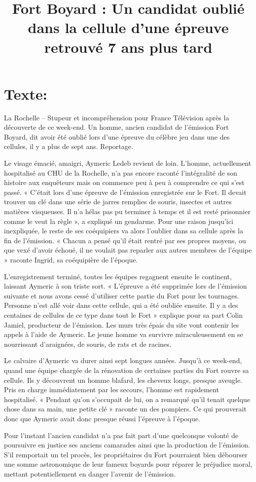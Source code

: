 \documentclass[11pt,a4paper]{article}
\title{Fort Boyard : Un candidat oublié dans la cellule d’une épreuve retrouvé 7 ans plus tard }
\begin{document}
\maketitle
\section*{Texte: }
La Rochelle – Stupeur et incompréhension pour France Télévision après la découverte de ce week-end. Un homme, ancien candidat de l’émission Fort Boyard, dit avoir été oublié lors d’une épreuve du célèbre jeu dans une des cellules, il y a plus de sept ans. Reportage.

Le visage émacié, amaigri, Aymeric Ledeb revient de loin. L’homme, actuellement hospitalisé au CHU de la Rochelle, n’a pas encore raconté l’intégralité de son histoire aux enquêteurs mais on commence peu à peu à comprendre ce qui s’est passé. « C’était lors d’une épreuve de l’émission enregistrée sur le Fort. Il devait trouver un clé dans une série de jarres remplies de souris, insectes et autres matières visqueuses. Il n’a hélas pas pu terminer à temps et il est resté prisonnier comme le veut la règle », a expliqué un gendarme. Pour une raison jusqu’ici inexpliquée, le reste de ses coéquipiers va alors l’oublier dans sa cellule après la fin de l’émission. « Chacun a pensé qu’il était rentré par ses propres moyens, ou que vexé d’avoir échoué, il ne voulait pas reparler aux autres membres de l’équipe » raconte Ingrid, sa coéquipière de l’époque.

L’enregistrement terminé, toutes les équipes regagnent ensuite le continent, laissant Aymeric à son triste sort. « L’épreuve a été supprimée lors de l’émission suivante et nous avons cessé d’utiliser cette partie du Fort pour les tournages. Personne n’est allé voir dans cette cellule, qui a été oubliée ensuite. Il y a des centaines de cellules de ce type dans tout le Fort » explique pour sa part Colin Jamiel, producteur de l’émission. Les murs très épais du site vont contenir les appels à l’aide de Aymeric. Le jeune homme va survivre miraculeusement en se nourrissant d’araignées, de souris, de rats  et de racines.

Le calvaire d’Aymeric va durer ainsi sept longues années. Jusqu’à ce week-end, quand une équipe chargée de la rénovation de certaines parties du Fort rouvre sa cellule. Ils y découvrent un homme blafard, les cheveux longs, presque aveugle. Pris en charge immédiatement par les secours, l’homme est rapidement hospitalisé. « Pendant qu’on s’occupait de lui, on a remarqué qu’il tenait quelque chose dans sa main, une petite clé » raconte un des pompiers. Ce qui prouverait donc que Aymeric avait donc presque réussi l’épreuve à l’époque.

Pour l’instant l’ancien candidat n’a pas fait part d’une quelconque volonté de poursuivre en justice ses anciens camarades ainsi que la production de l’émission. S’il remportait un tel procès, les propriétaires du Fort pourraient bien débourser une somme astronomique de leur fameux boyards pour réparer le préjudice moral, mettant potentiellement en danger l’avenir de l’émission.
\end{document}
